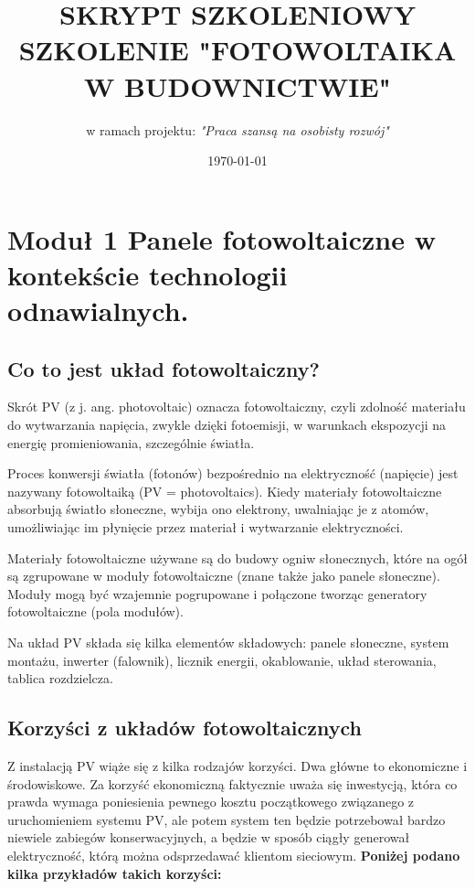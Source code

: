 \documentclass[12pt,a4paper]{article}
\title{SKRYPT SZKOLENIOWY SZKOLENIE "FOTOWOLTAIKA W BUDOWNICTWIE"}
\author{w ramach projektu: \textit{"Praca szansą na osobisty rozwój"} }
\date{\today}
\begin{document}
\maketitle
\tableofcontents

\section{Moduł 1 Panele fotowoltaiczne w kontekście technologii odnawialnych. }

\subsection{Co to jest układ fotowoltaiczny? }
Skrót PV (z j. ang. photovoltaic) oznacza fotowoltaiczny, czyli zdolność 
materiału do wytwarzania napięcia, zwykle dzięki fotoemisji, w warunkach 
ekspozycji na energię promieniowania, szczególnie światła. 

Proces konwersji światła (fotonów) bezpośrednio na elektryczność 
(napięcie) jest nazywany fotowoltaiką (PV = photovoltaics). Kiedy 
materiały fotowoltaiczne absorbują światło słoneczne, wybija ono 
elektrony, uwalniając je z atomów, umożliwiając im płynięcie przez 
materiał i wytwarzanie elektryczności. 

Materiały fotowoltaiczne używane są do budowy ogniw słonecznych, które 
na ogół są zgrupowane w moduły fotowoltaiczne (znane także jako panele 
słoneczne). Moduły mogą być wzajemnie pogrupowane i połączone tworząc 
generatory fotowoltaiczne (pola modułów). 

Na układ PV składa się kilka elementów składowych: panele słoneczne, 
system montażu, inwerter (falownik), licznik energii, okablowanie, układ 
sterowania, tablica rozdzielcza. 

\subsection{Korzyści z układów fotowoltaicznych }

Z instalacją PV wiąże się z kilka rodzajów korzyści. Dwa główne to 
ekonomiczne i środowiskowe. Za korzyść ekonomiczną faktycznie uważa się 
inwestycją, która co prawda wymaga poniesienia pewnego kosztu 
początkowego związanego z uruchomieniem systemu PV, ale potem system ten 
będzie potrzebował bardzo niewiele zabiegów konserwacyjnych, a będzie w 
sposób ciągły generował elektryczność, którą można odsprzedawać klientom 
sieciowym. \textbf{Poniżej podano kilka przykładów takich korzyści: }
\end{document}
